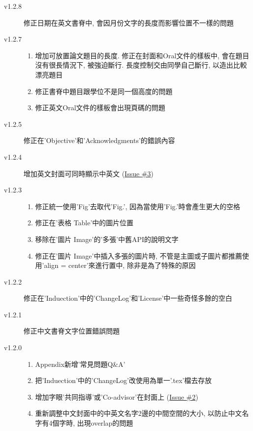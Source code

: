 \begin{description}
  \item[v1.2.8] 修正日期在英文書脊中, 會因月份文字的長度而影響位置不一樣的問題

  \item[v1.2.7] \hfill
    \begin{enumerate}
      \item 增加可放置論文題目的長度. 修正在封面和Oral文件的樣板中, 會在題目沒有很長情況下, 被強迫斷行. 長度控制交由同學自己斷行, 以造出比較漂亮題目
      \item 修正書脊中題目跟學位不是同一個高度的問題
      \item 修正英文Oral文件的樣板會出現頁碼的問題
    \end{enumerate}

  \item[v1.2.5] 修正在'Objective'和'Acknowledgments'的錯誤內容

  \item[v1.2.4] 增加英文封面可同時顯示中英文 (\href{https://github.com/wengan-li/ncku-thesis-template-latex/issues/3}{Issue \#3})

  \item[v1.2.3] \hfill
    \begin{enumerate}
      \item 修正統一使用'Fig'去取代'Fig.', 因為當使用'Fig.'時會產生更大的空格
      \item 修正在'表格 Table'中的圖片位置
      \item 移除在'圖片 Image'的'多張'中舊API的說明文字
      \item 修正在'圖片 Image'中插入多張的圖片時, 不管是主圖或子圖片都推薦使用'align = center'來進行置中, 除非是為了特殊的原因
    \end{enumerate}

  \item[v1.2.2] 修正在'Induection'中的'ChangeLog'和'License'中一些奇怪多餘的空白

  \item[v1.2.1] 修正中文書脊文字位置錯誤問題

  \item[v1.2.0] \hfill
    \begin{enumerate}
      \item Appendix新增'常見問題Q\&A'
      \item 把'Induection'中的'ChangeLog'改使用為單一'.tex'檔去存放
      \item 增加字眼'共同指導'或'Co-advisor'在封面上 (\href{https://github.com/wengan-li/ncku-thesis-template-latex/issues/2}{Issue \#2})
      \item 重新調整中文封面中的中英文名字2邊的中間空間的大小, 以防止中文名字有4個字時, 出現overlap的問題
    \end{enumerate}


\end{description}

